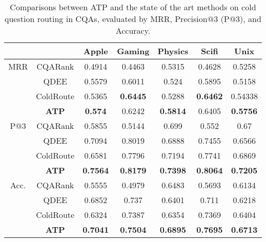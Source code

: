\documentclass[letterpaper]{article} \usepackage{aaai19}  \usepackage{times}  \usepackage{helvet}  \usepackage{courier}  \usepackage{url}  \usepackage{graphicx}  \usepackage{booktabs} \usepackage{xcolor}
\begin{document}
\begin{table}[t!]
\small
\centering
\setlength\tabcolsep{4pt} \caption{Comparisons between ATP and the state of the art methods on cold question routing in CQAs, evaluated by MRR, Precision$@3$ (P$@3$), and Accuracy.}
\begin{tabular}{@{}c|c|ccccc@{}}
 &  & Apple & Gaming & Physics & Scifi & Unix\\ \midrule
MRR & CQARank & 0.4914 & 0.4463 & 0.5315 & 0.4628 & 0.5258\\
 & QDEE & 0.5579 & 	0.6011 & 	0.524 & 	0.5895	 & 0.5158 \\
 & ColdRoute & 0.5365 &	\boldmath\textbf{0.6445} & 0.5288 & \boldmath\textbf{0.6462} &	0.54338 \\
 & \boldmath\textbf{ATP} & \boldmath\textbf{0.574} & 0.6242 & \boldmath\textbf{0.5814} & 0.6405 & \boldmath\textbf{0.5756}\\ \midrule


P@3 & CQARank & 0.5855 & 0.5144 & 0.699 & 0.552 & 0.67\\
 & QDEE &	0.7094 &	0.8019 &	0.6888 &	0.7455 &	0.6566 \\
 & ColdRoute & 	0.6581 & 	0.7796 & 	0.7194 & 	0.7741 & 	0.6869 \\
 & \boldmath\textbf{ATP} & \boldmath\textbf{0.7564} & \boldmath\textbf{0.8179} & \boldmath\textbf{0.7398} & \boldmath\textbf{0.8064} & \boldmath\textbf{0.7205} \\ \midrule 

Acc. & CQARank & 	0.5555 & 	0.4979 & 	0.6483 & 	0.5693 & 	0.6134\\
 & QDEE  & 	0.6852 & 	0.737 & 	0.6401	 & 0.711 & 	0.6218 \\
 & ColdRoute & 	0.6324 & 	0.7387 & 	0.6354	 & 0.7369 & 	0.6404\\
 & \boldmath\textbf{ATP} & 	\boldmath\textbf{0.7041} & 	\boldmath\textbf{0.7504} & 	\boldmath\textbf{0.6895} & 	\boldmath\textbf{0.7695}	 & \boldmath\textbf{0.6713}\\
  \bottomrule
 \end{tabular}
\label{tab:ATP_ColdQuestion_Routing_Table}
\end{table}
\end{document}
